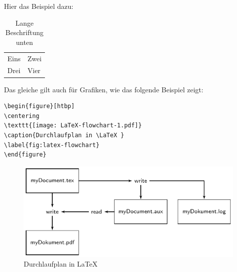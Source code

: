 \begin{frame}[fragile]

Hier das Beispiel dazu:
\begin{table}[htbp]
\centering

\begin{tabular}[t]{ll}
	\hline
	Eins & Zwei \\
	Drei & Vier \\
	\hline
\end{tabular}

\caption[Beschriftung unten]{Lange Beschriftung unten}
\label{tab:beispiel-tabelle1}
\end{table}

\end{frame}


\begin{frame}[fragile]

Das gleiche gilt auch für Grafiken, wie das folgende Beispiel zeigt:
\begin{lstlisting}
\begin{figure}[htbp]
\centering
\texttt{[image: LaTeX-flowchart-1.pdf]}
\caption{Durchlaufplan in \LaTeX }
\label{fig:latex-flowchart}
\end{figure}
\end{lstlisting}

\begin{figure}[htbp]
\centering
\includegraphics[scale=0.5]{../../texfiles-beamer/tex-material/WissArb-latex/LaTeX-flowchart-1.pdf}
\caption{Durchlaufplan in \LaTeX }
\label{fig:latex-flowchart}
\end{figure}

\end{frame}


